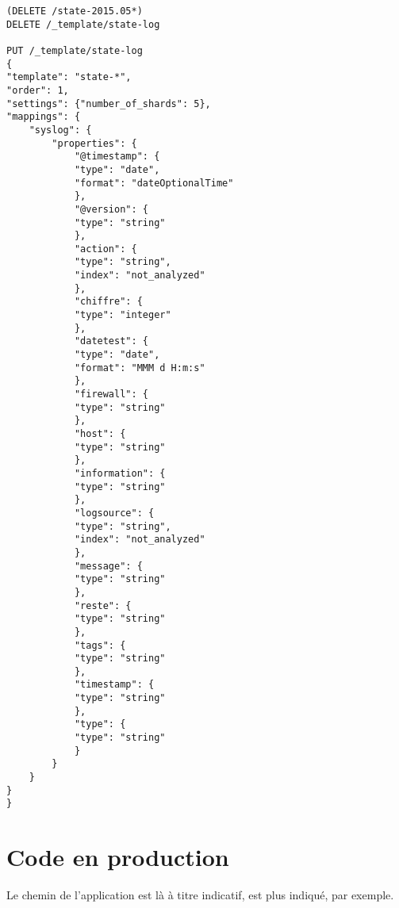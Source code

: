 \begin{lstlisting}[style=code,label={lst:mappingput2},caption={Ajouter un template de mapping}]
(DELETE /state-2015.05*)
DELETE /_template/state-log

PUT /_template/state-log
{
"template": "state-*",
"order": 1,
"settings": {"number_of_shards": 5},
"mappings": {
    "syslog": {
        "properties": {
            "@timestamp": {
            "type": "date",
            "format": "dateOptionalTime"
            },
            "@version": {
            "type": "string"
            },
            "action": {
            "type": "string",
            "index": "not_analyzed"
            },
            "chiffre": {
            "type": "integer"
            },
            "datetest": {
            "type": "date",
            "format": "MMM d H:m:s"              
            },
            "firewall": {
            "type": "string"
            },
            "host": {
            "type": "string"
            },
            "information": {
            "type": "string"
            },
            "logsource": {
            "type": "string",
            "index": "not_analyzed"
            },
            "message": {
            "type": "string"
            },
            "reste": {
            "type": "string"
            },
            "tags": {
            "type": "string"
            },
            "timestamp": {
            "type": "string"
            },
            "type": {
            "type": "string"
            }
        }
    }
}
}
\end{lstlisting}
\label{lst:mappingput2}

\section{Code en production}



Le chemin de l'application est là à titre indicatif,  est plus 
indiqué, par exemple.






